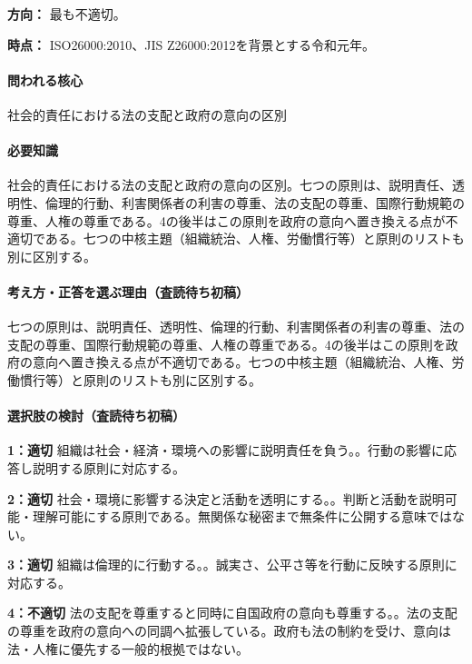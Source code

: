 \noindent\textbf{方向：} 最も不適切。\par

\noindent\textbf{時点：} ISO26000:2010、JIS Z26000:2012を背景とする令和元年。\par

\paragraph{問われる核心} 社会的責任における法の支配と政府の意向の区別

\paragraph{必要知識} 社会的責任における法の支配と政府の意向の区別。七つの原則は、説明責任、透明性、倫理的行動、利害関係者の利害の尊重、法の支配の尊重、国際行動規範の尊重、人権の尊重である。4の後半はこの原則を政府の意向へ置き換える点が不適切である。七つの中核主題（組織統治、人権、労働慣行等）と原則のリストも別に区別する。

\paragraph{考え方・正答を選ぶ理由（査読待ち初稿）} 七つの原則は、説明責任、透明性、倫理的行動、利害関係者の利害の尊重、法の支配の尊重、国際行動規範の尊重、人権の尊重である。4の後半はこの原則を政府の意向へ置き換える点が不適切である。七つの中核主題（組織統治、人権、労働慣行等）と原則のリストも別に区別する。

\paragraph{選択肢の検討（査読待ち初稿）}\mbox{}\par

\noindent\textbf{1：適切} 組織は社会・経済・環境への影響に説明責任を負う。。行動の影響に応答し説明する原則に対応する。\par

\noindent\textbf{2：適切} 社会・環境に影響する決定と活動を透明にする。。判断と活動を説明可能・理解可能にする原則である。無関係な秘密まで無条件に公開する意味ではない。\par

\noindent\textbf{3：適切} 組織は倫理的に行動する。。誠実さ、公平さ等を行動に反映する原則に対応する。\par

\noindent\textbf{4：不適切} 法の支配を尊重すると同時に自国政府の意向も尊重する。。法の支配の尊重を政府の意向への同調へ拡張している。政府も法の制約を受け、意向は法・人権に優先する一般的根拠ではない。\par

